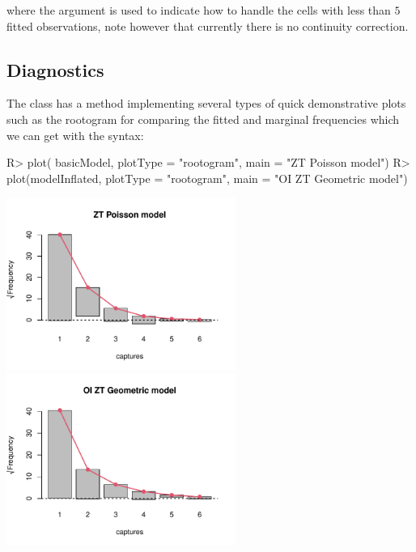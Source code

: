 \documentclass[
]{jss}
\newcommand{\1}{\mathcal{I}} \newcommand{\bZero}{\boldsymbol{0}}
\begin{document}
where the  argument is used to indicate how to handle the
cells with less than \(5\) fitted observations, note however that
currently there is no continuity correction.

\subsection{Diagnostics}\label{diagnostics}

The  class has a  method
implementing several types of quick demonstrative plots such as the
rootogram \citep[cf.][]{rootogram} for comparing the fitted and marginal
frequencies which we can get with the syntax:

\begin{CodeChunk}
\begin{CodeInput}
R> plot(   basicModel, plotType = "rootogram", main = "ZT Poisson model")
R> plot(modelInflated, plotType = "rootogram", main = "OI ZT Geometric model")
\end{CodeInput}


\begin{center}\includegraphics[width=7.5cm]{singleRcapture_files/figure-latex/rootogram-1} \includegraphics[width=7.5cm]{singleRcapture_files/figure-latex/rootogram-2} \end{center}

\end{CodeChunk}
\end{document}
